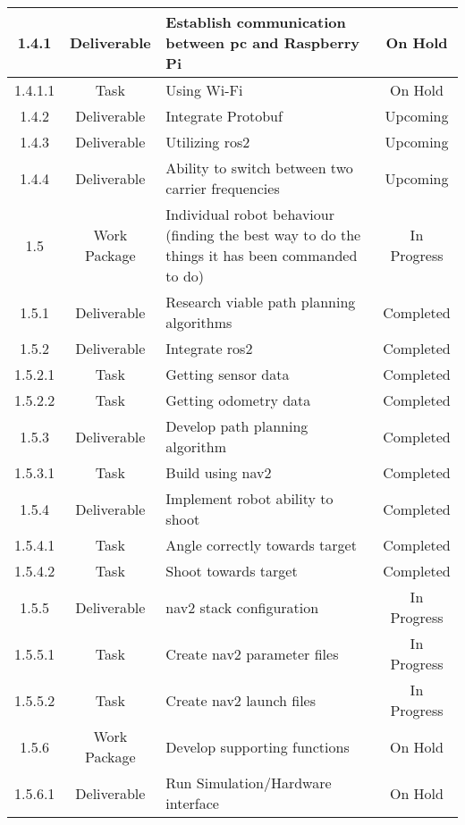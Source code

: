 \begin{longtable}{|c|c|m{}|c|}
    \rowcolor{h} 1.4.1 & Deliverable & Establish communication between \acs{pc} and Raspberry Pi & On Hold \\ \hline
    \rowcolor{h} 1.4.1.1 & Task & Using Wi-Fi & On Hold \\ \hline
    \rowcolor{u} 1.4.2 & Deliverable & Integrate Protobuf & Upcoming \\ \hline
    \rowcolor{u} 1.4.3 & Deliverable & Utilizing \acs{ros2} & Upcoming \\ \hline
    \rowcolor{u} 1.4.4 & Deliverable & Ability to switch between two carrier frequencies & Upcoming \\ \hline
    \rowcolor{p} 1.5 & Work Package & Individual robot behaviour (finding the best way to do the things it has been commanded to do) & In Progress \\ \hline
    \rowcolor{d} 1.5.1 & Deliverable & Research viable path planning algorithms & Completed \\ \hline
    \rowcolor{d} 1.5.2 & Deliverable & Integrate \acs{ros2} & Completed \\ \hline
    \rowcolor{d} 1.5.2.1 & Task & Getting sensor data & Completed \\ \hline
    \rowcolor{d} 1.5.2.2 & Task & Getting odometry data & Completed \\ \hline
    \rowcolor{d} 1.5.3 & Deliverable & Develop path planning algorithm & Completed \\ \hline
    \rowcolor{d} 1.5.3.1 & Task & Build using nav2 & Completed \\ \hline
    \rowcolor{d} 1.5.4 & Deliverable & Implement robot ability to shoot & Completed \\ \hline
    \rowcolor{d} 1.5.4.1 & Task & Angle correctly towards target & Completed \\ \hline
    \rowcolor{d} 1.5.4.2 & Task & Shoot towards target & Completed \\ \hline
    \rowcolor{p} 1.5.5 & Deliverable & nav2 stack configuration & In Progress \\ \hline
    \rowcolor{p} 1.5.5.1 & Task & Create nav2 parameter files & In Progress \\ \hline
    \rowcolor{p} 1.5.5.2 & Task & Create nav2 launch files & In Progress \\ \hline
    \rowcolor{h} 1.5.6 & Work Package & Develop supporting functions & On Hold \\ \hline
    \rowcolor{h} 1.5.6.1 & Deliverable & Run Simulation/Hardware interface & On Hold \\ \hline

\end{longtable}
